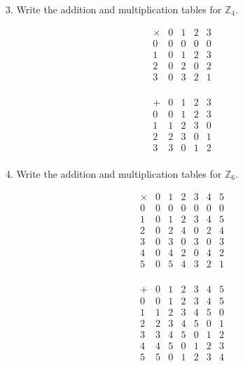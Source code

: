 \documentclass{hippoidC}
\begin{document}
\begin{prooflist}{3. Write the addition and multiplication tables for $\mathbb{Z}_4$.}
	\item \[
		\begin{array}{c|cccc}
			\times & 0 & 1 & 2 & 3 \\
			\hline
			0      & 0 & 0 & 0 & 0 \\
			1      & 0 & 1 & 2 & 3 \\
			2      & 0 & 2 & 0 & 2 \\
			3      & 0 & 3 & 2 & 1 \\
		\end{array} \]
	\item \[
		\begin{array}{c|cccc}
			+ & 0 & 1 & 2 & 3 \\
			\hline
			0 & 0 & 1 & 2 & 3 \\
			1 & 1 & 2 & 3 & 0 \\
			2 & 2 & 3 & 0 & 1 \\
			3 & 3 & 0 & 1 & 2 \\
		\end{array} \]

\end{prooflist}

\begin{prooflist}{4. Write the addition and multiplication tables for $\mathbb{Z}_6$.}
	\item \[
		\begin{array}{c|cccccc}
			\times & 0 & 1 & 2 & 3 & 4 & 5 \\
			\hline
			0      & 0 & 0 & 0 & 0 & 0 & 0 \\
			1      & 0 & 1 & 2 & 3 & 4 & 5 \\
			2      & 0 & 2 & 4 & 0 & 2 & 4 \\
			3      & 0 & 3 & 0 & 3 & 0 & 3 \\
			4      & 0 & 4 & 2 & 0 & 4 & 2 \\
			5      & 0 & 5 & 4 & 3 & 2 & 1 \\
		\end{array}
	\]
	\item \[
		\begin{array}{c|cccccc}
			+ & 0 & 1 & 2 & 3 & 4 & 5 \\
			\hline
			0 & 0 & 1 & 2 & 3 & 4 & 5 \\
			1 & 1 & 2 & 3 & 4 & 5 & 0 \\
			2 & 2 & 3 & 4 & 5 & 0 & 1 \\
			3 & 3 & 4 & 5 & 0 & 1 & 2 \\
			4 & 4 & 5 & 0 & 1 & 2 & 3 \\
			5 & 5 & 0 & 1 & 2 & 3 & 4 \\
		\end{array}
	\]
\end{prooflist}
\end{document}
